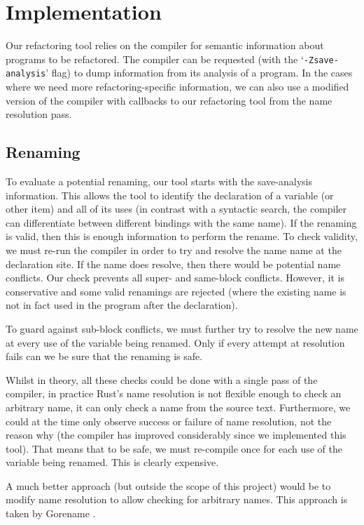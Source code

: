 \section{Implementation}\label{C:impl}

Our refactoring tool relies on the compiler for semantic information about programs to be refactored. The compiler can be requested (with the `\verb|-Zsave-analysis|' flag) to dump information from its analysis of a program. In the cases where we need more refactoring-specific information, we can also use a modified version of the compiler with callbacks to our refactoring tool from the name resolution pass.

\subsection{Renaming}

To evaluate a potential renaming, our tool starts with the save-analysis information. This allows the tool to identify the declaration of a variable (or other item) and all of its uses (in contrast with a syntactic search, the compiler can differentiate between different bindings with the same name). If the renaming is valid, then this is enough information to perform the rename. To check validity, we must re-run the compiler in order to try and resolve the name name at the declaration site. If the name does resolve, then there would be potential name conflicts. Our check prevents all super- and same-block conflicts. However, it is conservative and some valid renamings are rejected (where the existing name is not in fact used in the program after the declaration).

To guard against sub-block conflicts, we must further try to resolve the new name at every use of the variable being renamed. Only if every attempt at resolution fails can we be sure that the renaming is safe.

Whilst in theory, all these checks could be done with a single pass of the compiler, in practice Rust's name resolution is not flexible enough to check an arbitrary name, it can only check a name from the source text. Furthermore, we could at the time only observe success or failure of name resolution, not the reason why (the compiler has improved considerably since we implemented this tool). That means that to be safe, we must re-compile once for each use of the variable being renamed. This is clearly expensive.

A much better approach (but outside the scope of this project) would be to modify name resolution to allow checking for arbitrary names. This approach is taken by Gorename \cite{gorename15}.


